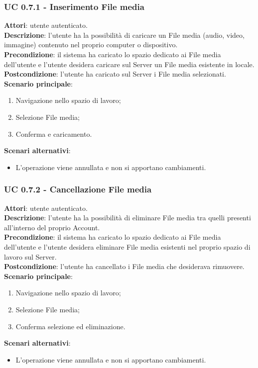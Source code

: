 \subsubsection{UC 0.7.1 - Inserimento File media}{
	\label{uc0.7.1}
	\textbf{Attori}: utente autenticato. \\
	\textbf{Descrizione}: l'utente ha la possibilità di caricare un File media (audio, video, immagine) contenuto nel proprio computer o dispositivo. \\
	\textbf{Precondizione}: il sistema ha caricato lo spazio dedicato ai File media dell'utente e l'utente desidera caricare sul Server un File media esistente in locale.	\\
	\textbf{Postcondizione}: l'utente ha caricato sul Server i File media selezionati.	\\
	\textbf{Scenario principale}:
	\begin{enumerate}
		\item Navigazione nello spazio di lavoro;
		\item Selezione File media;
		\item Conferma e caricamento.
	\end{enumerate}
	\textbf{Scenari alternativi}: 
	\begin{itemize}
		\item L'operazione viene annullata e non si apportano cambiamenti.
	\end{itemize}
	}
	\subsubsection{UC 0.7.2 - Cancellazione File media}{
		\label{uc0.7.2}
		\textbf{Attori}: utente autenticato.	\\
		\textbf{Descrizione}: l'utente ha la possibilità di eliminare File media tra quelli presenti all'interno del proprio Account. \\
		\textbf{Precondizione}: il sistema ha caricato lo spazio dedicato ai File media dell'utente e l'utente desidera eliminare File media esistenti nel proprio spazio di lavoro sul Server.	\\
		\textbf{Postcondizione}: l'utente ha cancellato i File media che desiderava rimuovere.	\\
		\textbf{Scenario principale}:
		\begin{enumerate}
			\item Navigazione nello spazio di lavoro;
			\item Selezione File media;
			\item Conferma selezione ed eliminazione.
		\end{enumerate}
		\textbf{Scenari alternativi}: 
		\begin{itemize}
			\item L'operazione viene annullata e non si apportano cambiamenti.
		\end{itemize}
		}
